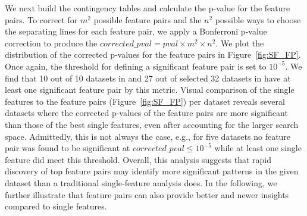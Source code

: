  We next build the contingency tables and calculate the p-value for the \topk feature pairs. To correct for $m^2$ possible feature pairs and the $n^2$ possible ways to choose the separating lines for each feature pair, we apply a Bonferroni p-value correction to produce the $ corrected\_pval = pval\times m^2 \times n^2$. We plot the distribution of the corrected p-values for the \topk feature pairs in Figure~\ref{fig:SF_FP}. Once again, the threshold for defining a significant feature pair is set to $10^{-5}$. We find that 10 out of 10 datasets in \msig and 27 out of selected 32 datasets in \lincs have at least one significant feature pair by this metric. Visual comparison of the \tophundred single features to the \tophundred feature pairs (Figure~\ref{fig:SF_FP}) per dataset reveals several datasets where the
corrected p-values of the feature pairs are more significant than those of the best single features, even after accounting for the larger search space. Admittedly, this is not always the case, e.g., for five \lincs datasets no feature pair was found to be significant at $ corrected\_pval \leq 10^{-5}$ while at least one single feature did meet this threshold. Overall, this analysis suggests that rapid discovery of top feature pairs may identify more significant patterns in the given dataset than a traditional single-feature analysis does.
In the following, we further illustrate that feature pairs can also provide better and newer insights compared to single features.


